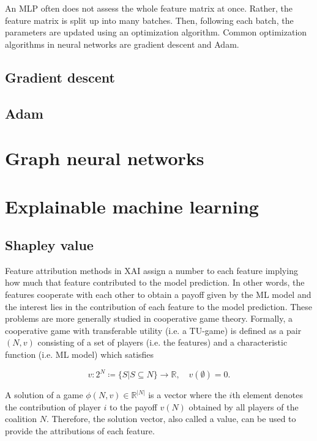 An MLP often does not assess the whole feature matrix at once. Rather, the feature
matrix is split up into many batches. Then, following each batch, the parameters are
updated using an optimization algorithm. Common optimization algorithms in neural networks
are gradient descent and Adam.


\subsection{Gradient descent}

\subsection{Adam}


\section{Graph neural networks}


\section{Explainable machine learning}


\subsection{Shapley value}
\label{subsec:shapley_value}

Feature attribution methods in XAI assign a number to each feature implying how
much that feature contributed to the model prediction.\cite{merrick2020explanation}
In other words, the features cooperate with each other to obtain a payoff given
by the ML model and the interest lies in the contribution of each feature to the
model prediction. These problems are more generally studied in cooperative game
theory. Formally, a cooperative game with transferable utility (i.e. a TU-game) is
defined as a pair $(N, v)$ consisting of a set of players (i.e. the features)
and a characteristic function (i.e. ML model) which satisfies\cite{zhang2022gstarx}


\begin{equation}
	v: 2^N \coloneqq \{S | S \subseteq N\} \rightarrow \mathbb{R}, \quad v\left(\emptyset\right) = 0.
\end{equation}


A solution of a game $\phi(N, v) \in \mathbb{R}^{|N|}$ is a vector where the $i$th element
denotes the contribution of player $i$ to the payoff $v(N)$ obtained by all players
of the coalition $N$.\cite{zhang2022gstarx} Therefore, the solution vector,
also called a value, can be used to provide the attributions of each feature.


